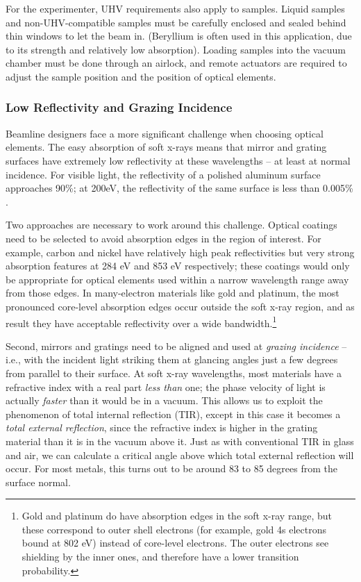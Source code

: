 For the experimenter, UHV requirements also apply to samples.  Liquid samples and non-UHV-compatible samples must be carefully enclosed and sealed behind thin windows to let the beam in. (Beryllium is often used in this application, due to its strength and relatively low absorption).  Loading samples into the vacuum chamber must be done through an airlock, and remote actuators are required to adjust the sample position and the position of optical elements.

\subsubsection{Low Reflectivity and Grazing Incidence}
Beamline designers face a more significant challenge when choosing optical elements.  The easy absorption of soft x-rays means that mirror and grating surfaces have extremely low reflectivity at these wavelengths -- at least at normal incidence.  For visible light, the reflectivity of a polished aluminum surface approaches 90\%; at 200eV, the reflectivity of the same surface is less than 0.005\% \cite{CXR11}.

Two approaches are necessary to work around this challenge.  Optical coatings need to be selected to avoid absorption edges in the region of interest.  For example, carbon and nickel have relatively high peak reflectivities 
but very strong absorption features at 284 eV and 853 eV respectively; these coatings would only be appropriate for optical elements used within a narrow wavelength range away from those edges.  In many-electron materials like gold and platinum, the most pronounced core-level absorption edges occur outside the soft x-ray region, and as result they have acceptable reflectivity over a wide bandwidth.\footnote{Gold and platinum do have absorption edges in the soft x-ray range, but these correspond to outer shell electrons (for example, gold 4s electrons bound at 802 eV) instead of core-level electrons. The outer electrons see shielding by the inner ones, and therefore have a lower transition probability.}

\label{TER-intro}
Second, mirrors and gratings need to be aligned and used at \emph{grazing incidence} -- i.e., with the incident light striking them at glancing angles just a few degrees from parallel to their surface.  At soft x-ray wavelengths, most materials have a refractive index with a real part \emph{less than} one; the phase velocity of light is actually \emph{faster} than it would be in a vacuum.  This allows us to exploit the phenomenon of total internal reflection (TIR), except in this case it becomes a \emph{total external reflection}, since the refractive index is higher in the grating material than it is in the vacuum above it.  Just as with conventional TIR in glass and air, we can calculate a critical angle above which total external reflection will occur.  
For most metals, this turns out to be around 83 to 85 degrees from the surface normal.

